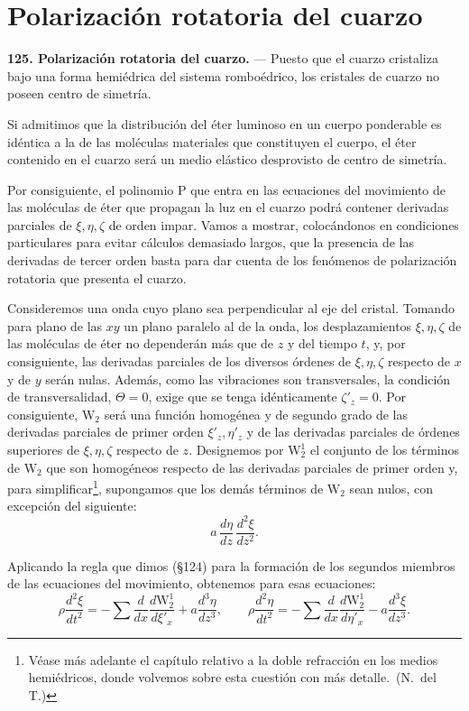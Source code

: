\section{Polarización rotatoria del cuarzo}

\noindent\textbf{125. Polarización rotatoria del cuarzo.} — Puesto que el cuarzo cristaliza bajo una forma
hemiédrica del sistema romboédrico, los cristales de cuarzo no poseen
centro de simetría.

Si admitimos que la distribución del éter luminoso en un cuerpo ponderable
es idéntica a la de las moléculas materiales que constituyen el cuerpo, el
éter contenido en el cuarzo será un medio elástico desprovisto de centro de
simetría.

Por consiguiente, el polinomio $\mathrm P$ que entra en las ecuaciones del
movimiento de las moléculas de éter que propagan la luz en el cuarzo podrá
contener derivadas parciales de $\xi,\eta,\zeta$ de orden impar. Vamos a
mostrar, colocándonos en condiciones particulares para evitar cálculos
demasiado largos, que la presencia de las derivadas de tercer orden basta
para dar cuenta de los fenómenos de polarización rotatoria que presenta el
cuarzo.

Consideremos una onda cuyo plano sea perpendicular al eje del cristal.
Tomando para plano de las $xy$ un plano paralelo al de la onda, los
desplazamientos $\xi,\eta,\zeta$ de las moléculas de éter no dependerán más
que de $z$ y del tiempo $t$, y, por consiguiente, las derivadas parciales
de los diversos órdenes de $\xi,\eta,\zeta$ respecto de $x$ y de $y$ serán
nulas. Además, como las vibraciones son transversales, la condición de
transversalidad, $\Theta=0$, exige que se tenga idénticamente $\zeta'_z=0$.
Por consiguiente, $\mathrm{W}_2$ será una función homogénea y de segundo grado de
las derivadas parciales de primer orden $\xi'_z,\eta'_z$ y de las derivadas
parciales de órdenes superiores de $\xi,\eta,\zeta$ respecto de $z$.
Designemos por $\mathrm{W}_2^1$ el conjunto de los términos de $\mathrm{W}_2$ que son
homogéneos respecto de las derivadas parciales de primer orden y, para
simplificar\footnote{Véase más adelante el capítulo relativo a la doble
refracción en los medios hemiédricos, donde volvemos sobre esta cuestión
con más detalle.~(N.~del T.)}, supongamos que los demás términos de $\mathrm{W}_2$ sean nulos,
con excepción del siguiente:
\[
a\,\frac{d\eta}{dz}\,\frac{d^2\xi}{dz^2}.
\]

Aplicando la regla que dimos (§124) para la formación de los segundos
miembros de las ecuaciones del movimiento, obtenemos para esas ecuaciones:
\[
\rho\frac{d^2\xi}{dt^2}=-\sum\frac{d}{dx}\frac{d\mathrm{W}_2^1}{d\xi'_x}+a\frac{d^3\eta}{dz^3},
\qquad
\rho\frac{d^2\eta}{dt^2}=-\sum\frac{d}{dx}\frac{d\mathrm{W}_2^1}{d\eta'_x}-a\frac{d^3\xi}{dz^3}.
\]

